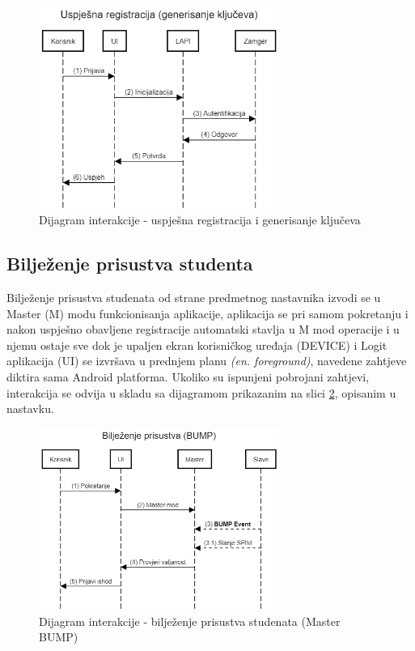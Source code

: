 \begin{figure}[H]
    \centering
    \includegraphics[width=0.7\textwidth]{material/dia/01_registracija}
    \caption{Dijagram interakcije - uspješna registracija i generisanje ključeva}
    \label{fig:int_dia_keygen}
\end{figure}

\subsection*{Bilježenje prisustva studenta}
Bilježenje prisustva studenata od strane predmetnog nastavnika izvodi se u Master (M) modu funkcionisanja aplikacije, aplikacija se pri samom pokretanju i nakon uspješno obavljene registracije automatski stavlja u M mod operacije i u njemu ostaje sve dok je upaljen ekran korisničkog uređaja (DEVICE) i Logit aplikacija (UI) se izvršava u prednjem planu \textit{(en. foreground)}, navedene zahtjeve diktira sama Android platforma. Ukoliko su ispunjeni pobrojani zahtjevi, interakcija se odvija u skladu sa dijagramom prikazanim na slici \ref{fig:int_dia_mbump}, opisanim u nastavku.

\begin{figure}[H]
    \centering
    \includegraphics[width=0.7\textwidth]{material/dia/02_bump}
    \caption{Dijagram interakcije - bilježenje prisustva studenata (Master BUMP)}
    \label{fig:int_dia_mbump}
\end{figure}

